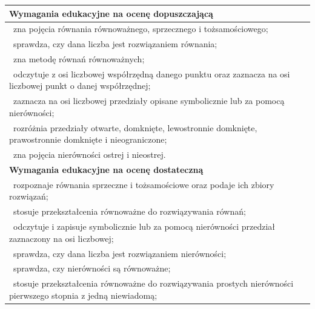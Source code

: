 \documentclass[12pt,a4paper]{article}
\begin{document}
	\begin{longtable}{|p{16cm}|}
		\hline
		
		\textbf{Wymagania edukacyjne na ocenę dopuszczającą} \\ \hline
		
		\textbullet\ zna pojęcia równania równoważnego, sprzecznego i tożsamościowego; \\
		
		\textbullet\ sprawdza, czy dana liczba jest rozwiązaniem równania; \\
		
		\textbullet\ zna metodę równań równoważnych; \\
		
		\textbullet\ odczytuje z osi liczbowej współrzędną danego punktu oraz zaznacza na osi liczbowej punkt o danej współrzędnej; \\
		
		\textbullet\ zaznacza na osi liczbowej przedziały opisane symbolicznie lub za pomocą nierówności; \\
		
		\textbullet\ rozróżnia przedziały otwarte, domknięte, lewostronnie domknięte, prawostronnie domknięte i nieograniczone; \\
		
		\textbullet\ zna pojęcia nierówności ostrej i nieostrej. \\ \hline
		
		\textbf{Wymagania edukacyjne na ocenę dostateczną} \\ \hline
		
		\textbullet\ rozpoznaje równania sprzeczne i tożsamościowe oraz podaje ich zbiory rozwiązań; \\
		
		\textbullet\ stosuje przekształcenia równoważne do rozwiązywania równań; \\
		
		\textbullet\ odczytuje i zapisuje symbolicznie lub za pomocą nierówności przedział zaznaczony na osi liczbowej; \\
		
		\textbullet\ sprawdza, czy dana liczba jest rozwiązaniem nierówności; \\
		
		\textbullet\ sprawdza, czy nierówności są równoważne; \\
		
		\textbullet\ stosuje przekształcenia równoważne do rozwiązywania prostych nierówności pierwszego stopnia z jedną niewiadomą; \\
		

\end{longtable}
\end{document}
